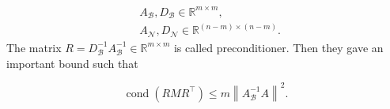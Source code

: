 \begin{equation}
\begin{aligned}
& A_{\mathcal{B}}, D_{\mathcal{B}} \in \mathbb{R}^{m \times m}, \\
& A_{\mathcal{N}}, D_{\mathcal{N}} \in \mathbb{R}^{(n-m) \times (n-m)}.
\end{aligned}
\end{equation}
The matrix $R=D_{\mathcal{B}}^{-1} A_{\mathcal{B}}^{-1} \in \mathbb{R}^{m \times m}$ is called preconditioner.
Then they gave an important bound such that

\begin{equation}
    \operatorname{cond}\left(R M R^{\top}\right) \leq m \left\|A_{\mathcal{B}}^{-1} A\right\|^2.
\end{equation}
